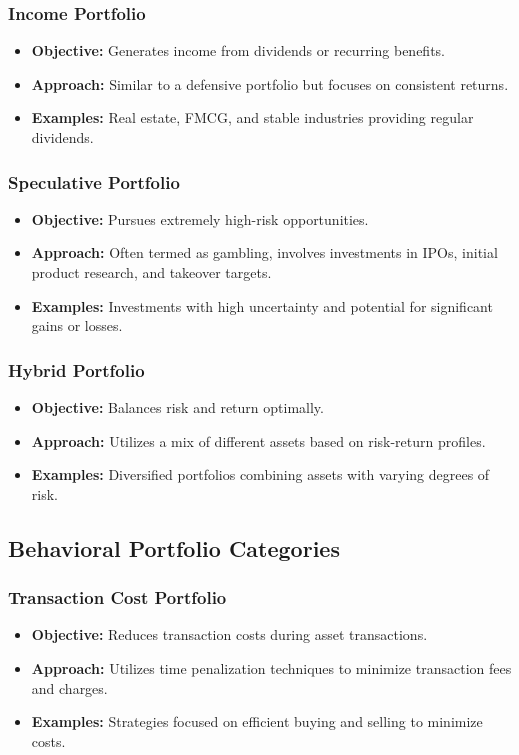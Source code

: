 \subsubsection{Income Portfolio}
\begin{itemize}
    \item \textbf{Objective:} Generates income from dividends or recurring benefits.
    \item \textbf{Approach:} Similar to a defensive portfolio but focuses on consistent returns.
    \item \textbf{Examples:} Real estate, FMCG, and stable industries providing regular dividends.
\end{itemize}

\subsubsection{Speculative Portfolio}
\begin{itemize}
    \item \textbf{Objective:} Pursues extremely high-risk opportunities.
    \item \textbf{Approach:} Often termed as gambling, involves investments in IPOs, initial product research, and takeover targets.
    \item \textbf{Examples:} Investments with high uncertainty and potential for significant gains or losses.
\end{itemize}

\subsubsection{Hybrid Portfolio}
\begin{itemize}
    \item \textbf{Objective:} Balances risk and return optimally.
    \item \textbf{Approach:} Utilizes a mix of different assets based on risk-return profiles.
    \item \textbf{Examples:} Diversified portfolios combining assets with varying degrees of risk.
\end{itemize}

\subsection{Behavioral Portfolio Categories}

\subsubsection{Transaction Cost Portfolio}
\begin{itemize}
    \item \textbf{Objective:} Reduces transaction costs during asset transactions.
    \item \textbf{Approach:} Utilizes time penalization techniques to minimize transaction fees and charges.
    \item \textbf{Examples:} Strategies focused on efficient buying and selling to minimize costs.
\end{itemize}

